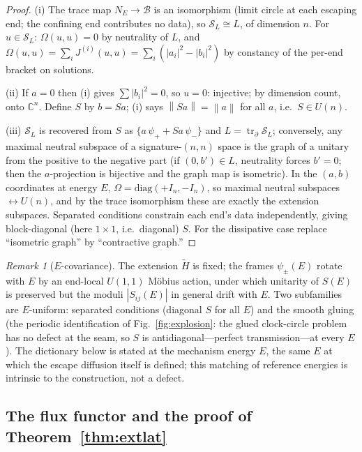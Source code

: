 \documentclass[11pt]{article}
\theoremstyle{definition}
\theoremstyle{remark}
\newtheorem{remark}[theorem]{Remark}
\newcommand{\btr}{\operatorname{tr}_{\partial}}
\newcommand{\norm}[1]{\left\lVert #1 \right\rVert}
\begin{document}
\begin{proof}
(i) The trace map $N_{E}\to\mathcal B$ is an isomorphism (limit circle
at each escaping end; the confining end contributes no data), so
$\mathcal S_{L}\cong L$, of dimension $n$. For $u\in\mathcal S_{L}$:
$\Omega(u,u)=0$ by neutrality of $L$, and
$\Omega(u,u)=\sum_{i}J^{(i)}(u,u)=\sum_{i}(|a_{i}|^{2}-|b_{i}|^{2})$ by
constancy of the per-end bracket on solutions.

(ii) If $a=0$ then (i) gives $\sum|b_{i}|^{2}=0$, so $u=0$: injective;
by dimension count, onto $\mathbb{C}^{n}$. Define $S$ by $b=Sa$; (i)
says $\norm{Sa}=\norm{a}$ for all $a$, i.e.\ $S\in U(n)$.

(iii) $\mathcal S_{L}$ is recovered from $S$ as
$\{a\,\psi_{+}+Sa\,\psi_{-}\}$ and $L=\btr\mathcal S_{L}$; conversely,
any maximal neutral subspace of a signature-$(n,n)$ space is the graph
of a unitary from the positive to the negative part (if $(0,b')\in L$,
neutrality forces $b'=0$; then the $a$-projection is bijective and the
graph map is isometric). In the $(a,b)$ coordinates at energy $E$,
$\Omega=\mathrm{diag}(+I_{n},-I_{n})$, so maximal neutral subspaces
$\leftrightarrow U(n)$, and by the trace isomorphism these are exactly
the extension subspaces. Separated conditions constrain each end's data
independently, giving block-diagonal (here $1\times1$, i.e.\ diagonal)
$S$. For the dissipative case replace ``isometric graph'' by
``contractive graph.''
\end{proof}

\begin{remark}[$E$-covariance]\label{rem:Ecovariance}
The extension $\tilde H$ is fixed; the frames $\psi_{\pm}(E)$ rotate
with $E$ by an end-local $U(1,1)$ M\"obius action, under which
unitarity of $S(E)$ is preserved but the moduli $|S_{ij}(E)|$ in
general drift with $E$. Two subfamilies are $E$-uniform: separated
conditions (diagonal $S$ for all $E$) and the smooth gluing (the
periodic identification of Fig.~\ref{fig:explosion}: the glued
clock-circle problem has no defect at the seam, so $S$ is
antidiagonal---perfect transmission---at every $E$). The dictionary
below is stated at the mechanism energy $E$, the same $E$ at which the
escape diffusion itself is defined; this matching of reference energies
is intrinsic to the construction, not a defect.
\end{remark}

\subsection{The flux functor and the proof of Theorem~\ref{thm:extlat}}
\label{app:completions-proof}
\end{document}
